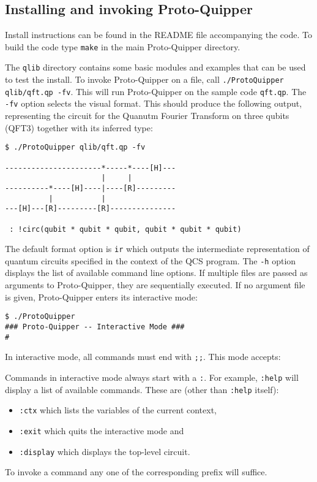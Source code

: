 \subsection{Installing and invoking Proto-Quipper}

Install instructions can be found in the README file accompanying the code. 
To build the code type \verb#make# in the main Proto-Quipper directory. 

The \verb#qlib# directory contains some basic modules and examples that can 
be used to test the install. To invoke Proto-Quipper on a file, call 
\verb#./ProtoQuipper qlib/qft.qp -fv#. This will run Proto-Quipper on the sample code \verb#qft.qp#. The \verb#-fv# option selects the visual format. 
This should produce the following output, representing the circuit for the 
Quanutm Fourier Transform on three qubits (QFT3) together with its inferred 
type:
\begin{verbatim}
$ ./ProtoQuipper qlib/qft.qp -fv

----------------------*-----*----[H]---
                      |     |          
----------*----[H]----|----[R]---------
          |           |                
---[H]---[R]---------[R]---------------

 : !circ(qubit * qubit * qubit, qubit * qubit * qubit)
\end{verbatim}
The default format option is \verb#ir# which outputs the intermediate representation of quantum circuits specified in the context of the QCS program. The \verb#-h# option displays the list of available command line 
options. If multiple files are passed as arguments to Proto-Quipper, they 
are sequentially executed. If no argument file is given, Proto-Quipper 
enters its interactive mode:
\begin{verbatim}
$ ./ProtoQuipper
### Proto-Quipper -- Interactive Mode ###
# 
\end{verbatim}
In interactive mode, all commands must end with \verb#;;#. This mode accepts:
Commands in interactive mode always start with a \verb#:#. For example, 
\verb#:help# will display a list of available commands. These are (other 
than \verb#:help# itself): 
\begin{itemize}
  \item \verb#:ctx# which lists the variables of the current context, 
  \item \verb#:exit# which quits the interactive mode and
  \item \verb#:display# which displays the top-level circuit.
\end{itemize}
To invoke a command any one of the corresponding prefix will suffice.

